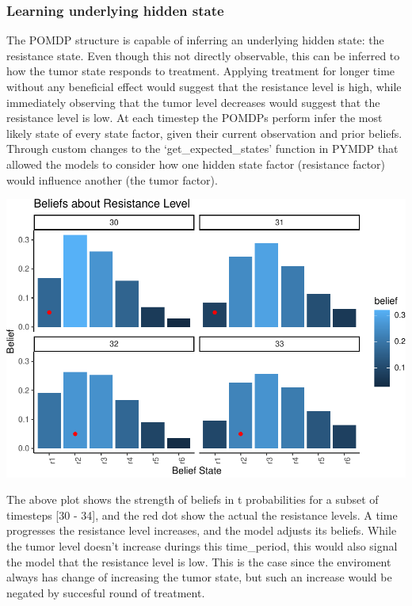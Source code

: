 \documentclass[notspecified,article,submit,moreauthors,pdftex]{Definitions/mdpi}
\begin{document}
\subsubsection{Learning underlying hidden
state}\label{learning-underlying-hidden-state}

The POMDP structure is capable of inferring an underlying hidden state:
the resistance state. Even though this not directly observable, this can
be inferred to how the tumor state responds to treatment. Applying
treatment for longer time without any beneficial effect would suggest
that the resistance level is high, while immediately observing that the
tumor level decreases would suggest that the resistance level is low. At
each timestep the POMDPs perform infer the most likely state of every
state factor, given their current observation and prior beliefs. Through
custom changes to the `get\_expected\_states' function in PYMDP that
allowed the models to consider how one hidden state factor (resistance
factor) would influence another (the tumor factor).

\includegraphics{SocultPaper_files/figure-latex/unnamed-chunk-4-1.pdf}

The above plot shows the strength of beliefs in t probabilities for a
subset of timesteps {[}30 - 34{]}, and the red dot show the actual the
resistance levels. A time progresses the resistance level increases, and
the model adjusts its beliefs. While the tumor level doesn't increase
durings this time\_period, this would also signal the model that the
resistance level is low. This is the case since the enviroment always
has change of increasing the tumor state, but such an increase would be
negated by succesful round of treatment.
\end{document}
